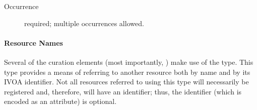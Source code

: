 \documentclass[11pt,a4paper]{ivoa}
\begin{document}
\begin{generated}
\begin{bigdescription}
\begin{description}
\item[Occurrence] required; multiple occurrences allowed.

\end{description}


\end{bigdescription}\endgroup

\endgroup
\end{generated}


\paragraph{Resource Names}

Several of the curation elements (most importantly,
\/) make use of the
 type.  This type provides a means of
referring to another resource both by name and by its IVOA
identifier.  Not all resources referred to using this type will
necessarily be registered and, therefore, will have an identifier;
thus, the identifier (which is encoded as an attribute) is optional. 
\end{document}
